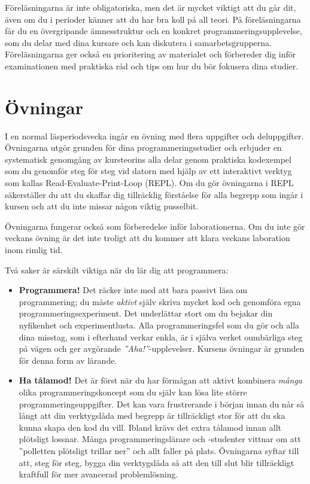 Föreläsningarna är inte obligatoriska, men det är mycket viktigt att du går dit, även om du i perioder känner att du har bra koll på all teori. På föreläsningarna får du en övergripande ämnesstruktur och en konkret programmeringsupplevelse, som du delar med dina kursare och kan diskutera i samarbetsgrupperna. Föreläsningarna ger också en prioritering av materialet och förbereder dig inför examinationen med praktiska råd och tips om hur du bör fokusera dina studier.

\section{Övningar}

I en normal läsperiodsvecka ingår en övning med flera uppgifter och deluppgifter.
Övningarna utgör grunden för dina programmeringsstudier och erbjuder en systematisk genomgång av kursteorins alla delar genom praktiska kodexempel som du genomför steg för steg vid datorn med hjälp av ett interaktivt verktyg som kallas Read-Evaluate-Print-Loop (REPL). Om du gör övningarna i REPL säkerställer du att du skaffar dig tillräcklig förståelse för alla begrepp som ingår i kursen och att du inte missar någon viktig pusselbit.

Övningarna fungerar också som förberedelse inför laborationerna. Om du inte gör veckans övning är det inte troligt att du kommer att klara veckans laboration inom rimlig tid.

Två saker är särskilt viktiga när du lär dig att programmera:
\begin{itemize}
\item \textbf{Programmera!} Det räcker inte med att bara passivt läsa om programmering; du måste \emph{aktivt} själv skriva mycket kod och genomföra egna programmeringsexperiment. Det underlättar stort om du bejakar din nyfikenhet och experimentlusta. Alla programmeringsfel som du gör och alla dina misstag, som i efterhand verkar enkla, är i själva verket oumbärliga steg på vägen och ger avgörande \emph{''Aha!''}-upplevelser. Kursens övningar är grunden för denna form av lärande.

\item \textbf{Ha tålamod!} Det är först när du har förmågan att aktivt kombinera \emph{många} olika programmeringskoncept som du själv kan lösa lite större programmeringsuppgifter. Det kan vara frustrerande i början innan du når så långt att din verktygslåda med begrepp är tillräckligt stor för att du ska kunna skapa den kod du vill. Ibland krävs det extra tålamod innan allt plötsligt lossnar. Många programmeringslärare och -studenter vittnar om att ''polletten plötsligt trillar ner'' och allt faller på plats. Övningarna syftar till att, steg för steg, bygga din verktygslåda så att den till slut blir tillräckligt kraftfull för mer avancerad problemlösning.
\end{itemize}

